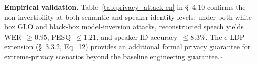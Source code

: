 \documentclass[11pt, a4paper]{article}
\begin{document}
\medskip
\noindent\textbf{Empirical validation.} Table~\ref{tab:privacy_attack-en} in \S~4.10 confirms the non-invertibility at both semantic and speaker-identity levels: under both white-box GLO and black-box model-inversion attacks, reconstructed speech yields WER~$\ge 0.95$, PESQ~$\le 1.21$, and speaker-ID accuracy~$\le 8.3\%$. The $\epsilon$-LDP extension (\S~3.3.2, Eq.~12) provides an additional formal privacy guarantee for extreme-privacy scenarios beyond the baseline engineering guarantee.\hfill$\square$

\newpage
\printbibliography
\end{document}
